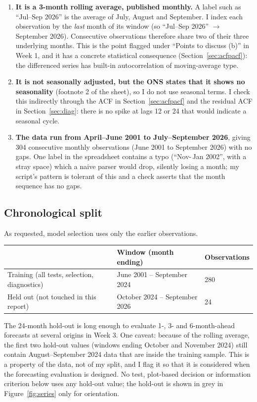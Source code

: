 \documentclass[11pt,a4paper]{article}
\begin{document}
\begin{enumerate}
\item \textbf{It is a 3-month rolling average, published monthly.} A label such as ``Jul--Sep 2026'' is the average of July, August and September. I index each observation by the \emph{last} month of its window (so ``Jul--Sep 2026'' $\to$ September 2026). Consecutive observations therefore share two of their three underlying months. This is the point flagged under ``Points to discuss (b)'' in Week 1, and it has a concrete statistical consequence (Section~\ref{sec:acfpacf}): the differenced series has built-in autocorrelation of moving-average type.
\item \textbf{It is not seasonally adjusted, but the ONS states that it shows no seasonality} (footnote 2 of the sheet), so I do not use seasonal terms. I check this indirectly through the ACF in Section~\ref{sec:acfpacf} and the residual ACF in Section~\ref{sec:diag}: there is no spike at lags 12 or 24 that would indicate a seasonal cycle.
\item \textbf{The data run from April--June 2001 to July--September 2026}, giving 304 consecutive monthly observations (June 2001 to September 2026) with no gaps. One label in the spreadsheet contains a typo (``Nov-\,Jan 2002'', with a stray space) which a naive parser would drop, silently losing a month; my script's pattern is tolerant of this and a check asserts that the month sequence has no gaps.
\end{enumerate}

\subsection{Chronological split}
As requested, model selection uses only the earlier observations.
\begin{center}
\begin{tabular}{lll}\toprule
 & Window (month ending) & Observations\\\midrule
Training (all tests, selection, diagnostics) & June 2001 -- September 2024 & 280\\
Held out (not touched in this report) & October 2024 -- September 2026 & 24\\\bottomrule
\end{tabular}
\end{center}
The 24-month hold-out is long enough to evaluate 1-, 3- and 6-month-ahead forecasts at several origins in Week 3. One caveat: because of the rolling average, the first two hold-out values (windows ending October and November 2024) still contain August--September 2024 data that are inside the training sample. This is a property of the data, not of my split, and I flag it so that it is considered when the forecasting evaluation is designed. No test, plot-based decision or information criterion below uses any hold-out value; the hold-out is shown in grey in Figure~\ref{fig:series} only for orientation.
\end{document}
